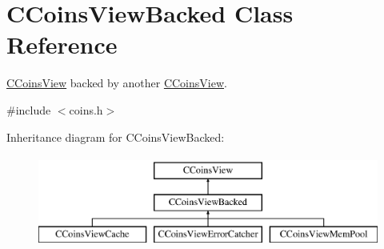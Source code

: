 \hypertarget{class_c_coins_view_backed}{}\section{C\+Coins\+View\+Backed Class Reference}
\label{class_c_coins_view_backed}


\hyperlink{class_c_coins_view}{C\+Coins\+View} backed by another \hyperlink{class_c_coins_view}{C\+Coins\+View}.  




{\ttfamily \#include $<$coins.\+h$>$}

Inheritance diagram for C\+Coins\+View\+Backed\+:\begin{figure}[H]
\begin{center}
\leavevmode
\includegraphics[height=3.000000cm]{class_c_coins_view_backed}
\end{center}
\end{figure}
